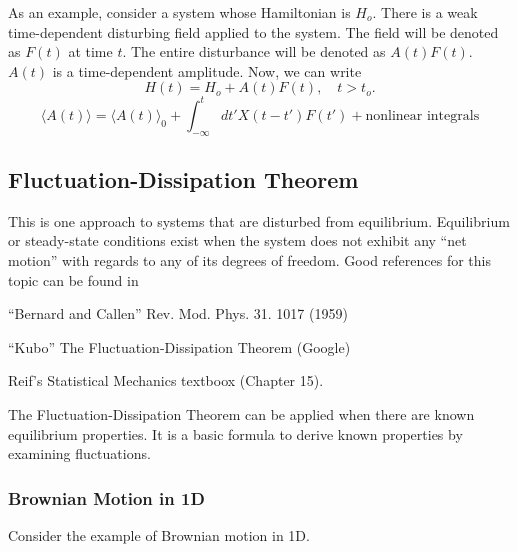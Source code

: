 \documentclass{article}
\begin{document}
As an example, consider a system whose Hamiltonian is $ H_{o} $. There is a weak
time-dependent disturbing field applied to the system. The field will be denoted
as $ F(t) $ at time $ t $. The entire disturbance will be denoted as $A(t)F(t)$.
$ A(t) $ is a time-dependent amplitude. Now, we can write
\[
   H(t) = H_{o} + A(t) F(t), \quad t > t_{o}.
\]
\[
   \langle A(t) \rangle = \langle A(t) \rangle_{0} + \int_{-\infty}^{t} dt'
   X(t-t') F(t') + \text{nonlinear integrals}
\]

\subsection{Fluctuation-Dissipation Theorem}
\label{sub:fluctuation_dissipation_theorem}

This is one approach to systems that are disturbed from equilibrium. Equilibrium
or steady-state conditions exist when the system does not exhibit any ``net
motion'' with regards to any of its degrees of freedom. Good references for this
topic can be found in

``Bernard and Callen'' Rev. Mod. Phys. 31. 1017 (1959)

``Kubo'' The Fluctuation-Dissipation Theorem (Google)

Reif's Statistical Mechanics textboox (Chapter 15).

The Fluctuation-Dissipation Theorem can be applied when there are known
equilibrium properties. It  is a basic formula to derive known properties by
examining fluctuations.

\subsubsection{Brownian Motion in 1D}
\label{sub:brownian_motion_in_1d}

Consider the example of Brownian motion in 1D.
\end{document}
